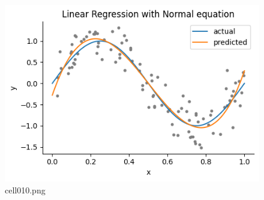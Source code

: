 \begin{figure}[ht]
	\centering
	\includegraphics[scale=0.8, max width=\linewidth]{./fig/introduction/linear-regression/cell010.png}
	\caption{cell010.png}
	\label{cell010.png}
\end{figure}